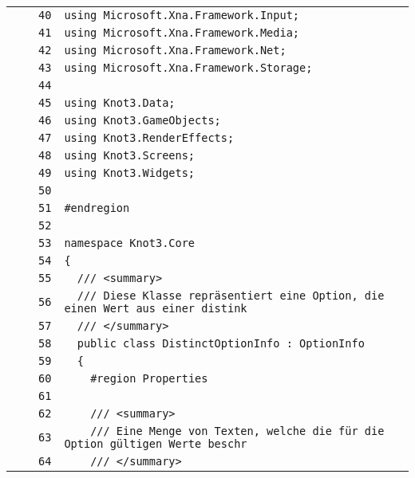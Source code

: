 \documentclass[a4paper,10pt]{article}
\begin{document}
\begin{longtable}[l]{lrrl}
\cellcolor{gray} &  & \verb~40~ & \verb~using Microsoft.Xna.Framework.Input;~\\
\cellcolor{gray} &  & \verb~41~ & \verb~using Microsoft.Xna.Framework.Media;~\\
\cellcolor{gray} &  & \verb~42~ & \verb~using Microsoft.Xna.Framework.Net;~\\
\cellcolor{gray} &  & \verb~43~ & \verb~using Microsoft.Xna.Framework.Storage;~\\
\cellcolor{gray} &  & \verb~44~ & \verb~~\\
\cellcolor{gray} &  & \verb~45~ & \verb~using Knot3.Data;~\\
\cellcolor{gray} &  & \verb~46~ & \verb~using Knot3.GameObjects;~\\
\cellcolor{gray} &  & \verb~47~ & \verb~using Knot3.RenderEffects;~\\
\cellcolor{gray} &  & \verb~48~ & \verb~using Knot3.Screens;~\\
\cellcolor{gray} &  & \verb~49~ & \verb~using Knot3.Widgets;~\\
\cellcolor{gray} &  & \verb~50~ & \verb~~\\
\cellcolor{gray} &  & \verb~51~ & \verb~#endregion~\\
\cellcolor{gray} &  & \verb~52~ & \verb~~\\
\cellcolor{gray} &  & \verb~53~ & \verb~namespace Knot3.Core~\\
\cellcolor{gray} &  & \verb~54~ & \verb~{~\\
\cellcolor{gray} &  & \verb~55~ & \verb~  /// <summary>~\\
\cellcolor{gray} &  & \verb~56~ & \verb~  /// Diese Klasse repräsentiert eine Option, die einen Wert aus einer distink~\\
\cellcolor{gray} &  & \verb~57~ & \verb~  /// </summary>~\\
\cellcolor{gray} &  & \verb~58~ & \verb~  public class DistinctOptionInfo : OptionInfo~\\
\cellcolor{gray} &  & \verb~59~ & \verb~  {~\\
\cellcolor{gray} &  & \verb~60~ & \verb~    #region Properties~\\
\cellcolor{gray} &  & \verb~61~ & \verb~~\\
\cellcolor{gray} &  & \verb~62~ & \verb~    /// <summary>~\\
\cellcolor{gray} &  & \verb~63~ & \verb~    /// Eine Menge von Texten, welche die für die Option gültigen Werte beschr~\\
\cellcolor{gray} &  & \verb~64~ & \verb~    /// </summary>~\\

\end{longtable}
\end{document}
